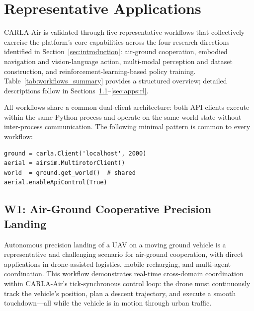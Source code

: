 
\section{Representative Applications}
\label{sec:apps}

CARLA-Air is validated through five representative workflows that collectively
exercise the platform's core capabilities across the four research directions
identified in Section~\ref{sec:introduction}: air-ground cooperation, embodied
navigation and vision-language action, multi-modal perception and dataset
construction, and reinforcement-learning-based policy training.
Table~\ref{tab:workflows_summary} provides a structured overview; detailed
descriptions follow in Sections~\ref{sec:apps:coop}--\ref{sec:apps:rl}.



All workflows share a common dual-client architecture: both API clients execute
within the same Python process and operate on the same world state without
inter-process communication.
The following minimal pattern is common to every workflow:

{\footnotesize
\begin{verbatim}
ground = carla.Client('localhost', 2000)
aerial = airsim.MultirotorClient()
world  = ground.get_world()  # shared
aerial.enableApiControl(True)
\end{verbatim}
}



\subsection{W1: Air-Ground Cooperative Precision Landing}
\label{sec:apps:coop}

Autonomous precision landing of a UAV on a moving ground vehicle is a
representative and challenging scenario for air-ground cooperation, with
direct applications in drone-assisted logistics, mobile recharging, and
multi-agent coordination.
This workflow demonstrates real-time cross-domain coordination within
CARLA-Air's tick-synchronous control loop: the drone must continuously track
the vehicle's position, plan a descent trajectory, and execute a smooth
touchdown---all while the vehicle is in motion through urban traffic.

